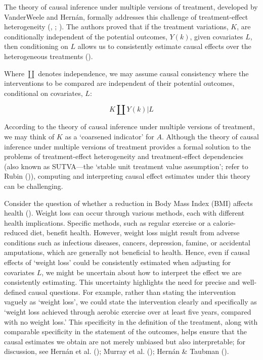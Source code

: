 \documentclass[
  single column]{article}
\begin{document}
The theory of causal inference under multiple versions of treatment,
developed by VanderWeele and Hernán, formally addresses this challenge
of treatment-effect heterogeneity
(,
;
). The
authors proved that if the treatment variations, \(K\), are
conditionally independent of the potential outcomes, \(Y(k)\), given
covariates \(L\), then conditioning on \(L\) allows us to consistently
estimate causal effects over the heterogeneous treatments
().

Where \(\coprod\) denotes independence, we may assume causal consistency
where the interventions to be compared are independent of their
potential outcomes, conditional on covariates, \(L\):

\[
K \coprod Y(k) | L
\]

According to the theory of causal inference under multiple versions of
treatment, we may think of \(K\) as a `coarsened indicator' for \(A\).
Although the theory of causal inference under multiple versions of
treatment provides a formal solution to the problems of treatment-effect
heterogeneity and treatment-effect dependencies (also known as
SUTVA---the `stable unit treatment value assumption'; refer to Rubin
()), computing and
interpreting causal effect estimates under this theory can be
challenging.

Consider the question of whether a reduction in Body Mass Index (BMI)
affects health ().
Weight loss can occur through various methods, each with different
health implications. Specific methods, such as regular exercise or a
calorie-reduced diet, benefit health. However, weight loss might result
from adverse conditions such as infectious diseases, cancers,
depression, famine, or accidental amputations, which are generally not
beneficial to health. Hence, even if causal effects of `weight loss'
could be consistently estimated when adjusting for covariates \(L\), we
might be uncertain about how to interpret the effect we are consistently
estimating. This uncertainty highlights the need for precise and
well-defined causal questions. For example, rather than stating the
intervention vaguely as `weight loss', we could state the intervention
clearly and specifically as `weight loss achieved through aerobic
exercise over at least five years, compared with no weight loss.' This
specificity in the definition of the treatment, along with comparable
specificity in the statement of the outcomes, helps ensure that the
causal estimates we obtain are not merely unbiased but also
interpretable; for discussion, see Hernán et al.
(); Murray et al.
(); Hernán \& Taubman
().
\end{document}
